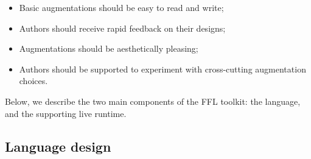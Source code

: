 \begin{itemize}
\item Basic augmentations should be easy to read and write;
\item Authors should receive rapid feedback on their designs;
\item Augmentations should be aesthetically pleasing;
\item Authors should be supported to experiment with cross-cutting augmentation choices.
\end{itemize}

Below, we describe the two main components of the FFL toolkit: the language, and the supporting live runtime.


\subsection{Language design}



